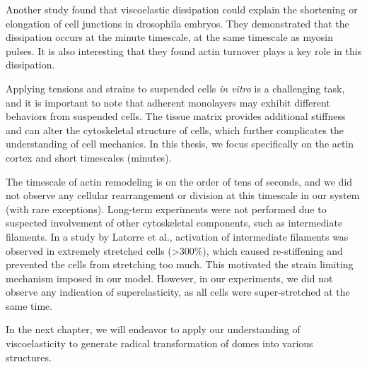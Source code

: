 Another study found that viscoelastic dissipation could explain the
shortening or elongation of cell junctions in drosophila embryos. They
demonstrated that the dissipation occurs at the minute timescale, at the
same timescale as myosin pulses. It is also interesting that they found
actin turnover plays a key role in this dissipation.

Applying tensions and strains to suspended cells \textit{in vitro} is a
challenging task, and it is important to note that adherent monolayers
may exhibit different behaviors from suspended cells. The tissue matrix
provides additional stiffness and can alter the cytoskeletal structure
of cells, which further complicates the understanding of cell mechanics.
In this thesis, we focus specifically on the actin cortex and short
timescales (minutes).

The timescale of actin remodeling is on the order of tens of seconds,
and we did not observe any cellular rearrangement or division at this
timescale in our system (with rare exceptions). Long-term experiments
were not performed due to suspected involvement of other cytoskeletal
components, such as intermediate filaments. In a study by Latorre et
al., activation of intermediate filaments was observed in extremely
stretched cells (\textgreater300\%), which caused re-stiffening and
prevented the cells from stretching too much. This motivated the strain
limiting mechanism imposed in our model. However, in our experiments, we
did not observe any indication of superelasticity, as all cells were
super-stretched at the same time.

In the next chapter, we will endeavor to apply our understanding of
viscoelasticity to generate radical transformation of domes into various
structures.
